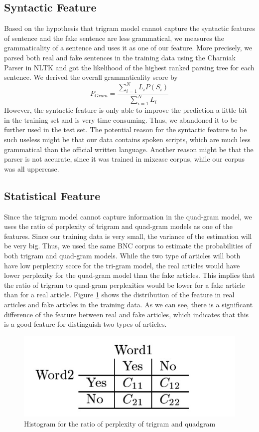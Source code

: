 \begin{itemize}
 
\end{itemize}


\subsection{Syntactic Feature}
Based on the hypothesis that trigram model cannot capture the syntactic features of sentence and the fake sentence are less grammatical, we measures the grammaticality of a sentence and uses it as one of our feature. More precisely, we parsed both real and fake sentences in the training data using the Charniak Parser in NLTK and got the likelihood of the highest ranked parsing tree for each sentence. We derived the overall grammaticality score by 
$$P_{Gram} = \frac{\sum_{i=1}^N L_iP(S_i)}{\sum_{i=1}^N L_i}$$
However, the syntactic feature is only able to improve the prediction a little bit in the training set and is very time-consuming. Thus, we abandoned it to be further used in the test set.
The potential reason for the syntactic feature to be such useless might be that our data contains spoken scripts, which are much less grammatical than the official written language. Another reason might be that the parser is not accurate, since it was trained in mixcase corpus, while our corpus was all uppercase.

\subsection{Statistical Feature}
Since the trigram model cannot capture information in the quad-gram model, we uses the ratio of perplexity of trigram and quad-gram models as one of the features. Since our training data is very small, the variance of the estimation will be very big. Thus, we used the same BNC corpus to estimate the probabilities of both trigram and quad-gram models. While the two type of articles will both have low perplexity score for the tri-gram model, the real articles would have lower perplexity for the quad-gram model than the fake articles. This implies that the ratio of trigram to quad-gram perplexities would be lower for a fake article than for a real article. Figure \ref{fig:ratio} shows the distribution of the feature in real articles and fake articles in the training data. As we can see, there is a significant difference of the feature between real and fake articles, which indicates that this is a good feature for distinguish two types of articles. 

\begin{figure}
\centering  
\includegraphics[width = 0.4\linewidth]{./FIG/030/ratio}\hfill
\caption{Histogram for the ratio of perplexity of trigram and quadgram} \label{fig:ratio}
\end{figure}


